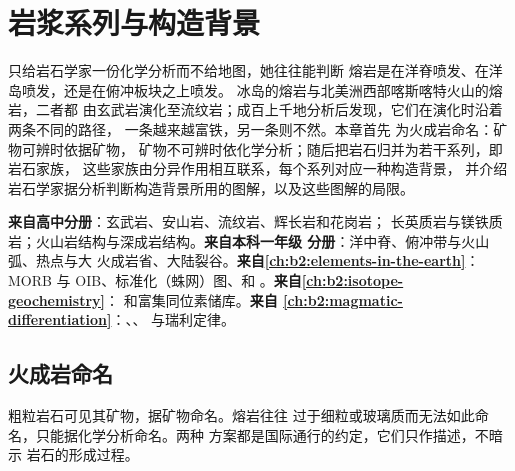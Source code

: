 \chapter{岩浆系列与构造背景}\label{ch:b2:magmatic-series}

只给岩石学家一份化学分析而不给地图，她往往能判断
熔岩是在洋脊喷发、在洋岛喷发，还是在俯冲板块之上喷发。
冰岛的熔岩与北美洲西部喀斯喀特火山的熔岩，二者都
由玄武岩演化至流纹岩；成百上千地分析后发现，它们在演化时沿着两条不同的路径，
一条越来越富铁，另一条则不然。本章首先
为火成岩命名：矿物可辨时依据矿物，
矿物不可辨时依化学分析；随后把岩石归并为若干系列，即岩石家族，
这些家族由分异作用相互联系，每个系列对应一种构造背景，
并介绍岩石学家据分析判断构造背景所用的图解，以及这些图解的局限。

\begin{recall}
\textbf{来自高中分册}：玄武岩、安山岩、流纹岩、辉长岩和花岗岩；
长英质岩与镁铁质岩；火山岩结构与深成岩结构。\textbf{来自本科一年级
分册}：洋中脊、俯冲带与火山弧、热点与大
火成岩省、大陆裂谷。\textbf{来自\cref{ch:b2:elements-in-the-earth}}：
MORB 与 OIB、标准化（蛛网）图、和
。\textbf{来自\cref{ch:b2:isotope-geochemistry}}：
和富集同位素储库。\textbf{来自
\cref{ch:b2:magmatic-differentiation}}：、、
与瑞利定律。
\end{recall}

\section{火成岩命名}\label{sec:b2:magmatic-series:naming}

粗粒岩石可见其矿物，据矿物命名。熔岩往往
过于细粒或玻璃质而无法如此命名，只能据化学分析命名。两种
方案都是国际通行的约定，它们只作描述，不暗示
岩石的形成过程。


